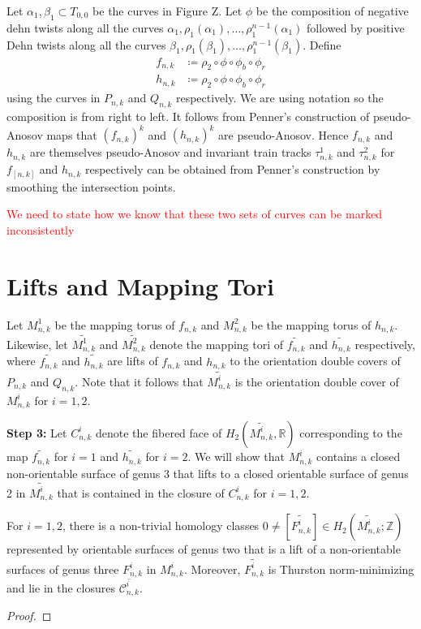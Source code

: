 Let $\alpha_1,\beta_1 \subset T_{0,0}$ be the curves in Figure Z. Let $\phi$ be the composition of negative dehn twists along all the curves $\alpha_1, \rho_1(\alpha_1), \dots, \rho_1^{n-1}(\alpha_1)$ followed by positive Dehn twists along all the curves $\beta_1,\rho_1(\beta_1),\dots,\rho_1^{n-1}(\beta_1)$. Define
\begin{align*}
    f_{n,k} &\coloneqq \rho_2 \circ \phi \circ \phi_b \circ \phi_r \\
    h_{n,k} & \coloneqq \rho_2 \circ \phi \circ \phi_b \circ \phi_r
\end{align*}
using the curves in $P_{n,k}$ and $Q_{n,k}$ respectively. We are using notation so the composition is from right to left. It follows from Penner's construction of pseudo-Anosov maps that $(f_{n,k})^k$ and $(h_{n,k})^k$ are pseudo-Anosov. Hence $f_{n,k}$ and $h_{n,k}$ are themselves pseudo-Anosov and invariant train tracks $\tau^1_{n,k}$ and $\tau^2_{n,k}$ for $f_[n,k]$ and $h_{n,k}$ respectively can be obtained from Penner's construction by smoothing the intersection points.

\textcolor{red}{We need to state how we know that these two sets of curves can be marked inconsistently}

\section{Lifts and Mapping Tori}

Let $M^1_{n,k}$ be the mapping torus of $f_{n,k}$ and $M^2_{n,k}$ be the mapping torus of $h_{n,k}$. Likewise, let $\widetilde{M^1_{n,k}}$ and $\widetilde{M^2_{n,k}}$ denote the mapping tori of $\widetilde{f_{n,k}}$ and $\widetilde{h_{n,k}}$ respectively, where $\widetilde{f_{n,k}}$ and $\widetilde{h_{n,k}}$ are lifts of $f_{n,k}$ and $h_{n,k}$ to the orientation double covers of $P_{n,k}$ and $Q_{n,k}$. Note that it follows that $\widetilde{M^i_{n,k}}$ is the orientation double cover of $M^i_{n,k}$ for $i = 1,2$. 

\textbf{Step 3:} Let $C^i_{n,k}$ denote the fibered face of $H_2(\widetilde{M^i_{n,k}},\mathbb{R})$ corresponding to the map $\widetilde{f_{n,k}}$ for $i = 1$ and $\widetilde{h_{n,k}}$ for $i = 2$. We will show that $M^i_{n,k}$ contains a closed non-orientable surface of genus 3 that lifts to a closed orientable surface of genus 2 in $\widetilde{M^i_{n,k}}$ that is contained in the closure of $C^i_{n,k}$ for $i = 1,2$.

\begin{lem}
For $i = 1,2$, there is a non-trivial homology classes $0 \neq [\widetilde{F^i_{n,k}}] \in H_2(\widetilde{M^i_{n,k}};\mathbb{Z})$ represented by orientable surfaces of genus two that is a lift of a non-orientable surfaces of genus three $F^i_{n,k}$ in $M^i_{n,k}$. Moreover, $\widetilde{F^i_{n,k}}$ is Thurston norm-minimizing and lie in the closures $\overline{\mathcal{C}^i_{n,k}}$.
\end{lem}
\begin{proof}

\end{proof}

